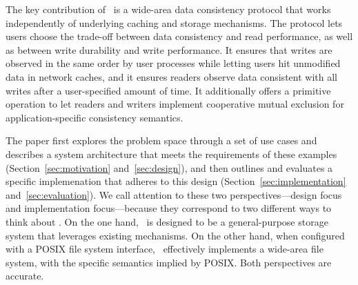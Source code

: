 The key contribution of \Syndicate\ is a wide-area data consistency protocol that works independently of underlying caching and storage mechanisms. The protocol lets users choose the trade-off between data consistency and read performance, as well as between write durability and write performance. It ensures that writes are observed in the same order by user processes while letting users hit unmodified data in network caches, and it ensures readers observe data consistent with all writes after a user-specified amount of time. It additionally offers a primitive operation to let readers and writers implement cooperative mutual exclusion for application-specific consistency semantics.

The paper first explores the problem space through a set of use cases and describes a system architecture that meets the requirements of these examples (Section~\ref{sec:motivation} and~\ref{sec:design}), and then outlines and evaluates a specific implemenation that adheres to this design (Section~\ref{sec:implementation} and~\ref{sec:evaluation}). We call attention to these two perspectives---design focus and implementation focus---because they correspond to two different ways to think about \Syndicate. On the one hand, \Syndicate\ is designed to be a general-purpose storage system that leverages existing mechanisms. On the other hand, when configured with a POSIX file system interface, \Syndicate\ effectively implements a wide-area file system, with the specific semantics implied by POSIX. Both perspectives are accurate.

